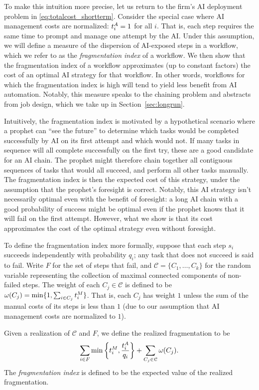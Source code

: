 To make this intuition more precise, let us return to the firm's AI deployment problem in \eqref{eq:totalcost_shortterm}.
Consider the special case where AI management costs are normalized: $t^{A}_{i} = 1$ for all $i$.
That is, each step requires the same time to prompt and manage one attempt by the AI.
Under this assumption, we will define a measure of the dispersion of AI-exposed steps in a workflow, which we refer to as the \emph{fragmentation index} of a workflow.
We then show that the fragmentation index of a workflow approximates (up to constant factors) the cost of an optimal AI strategy for that workflow.
In other words, workflows for which the fragmentation index is high will tend to yield less benefit from AI automation.
Notably, this measure speaks to the chaining problem and abstracts from job design, which we take up in Section~\ref{sec:longrun}.

Intuitively, the fragmentation index is motivated by a hypothetical scenario where a prophet can ``see the future'' to determine which tasks would be completed successfully by AI on its first attempt and which would not.
If many tasks in sequence will all complete successfully on the first try, these are a good candidate for an AI chain.
The prophet might therefore chain together all contiguous sequences of tasks that would all succeed, and perform all other tasks manually.
The fragmentation index is then the expected cost of this strategy, under the assumption that the prophet's foresight is correct.
Notably, this AI strategy isn't necessarily optimal even with the benefit of foresight: a long AI chain with a good probability of success might be optimal even if the prophet knows that it will fail on the first attempt.
However, what we show is that its cost approximates the cost of the optimal strategy even without foresight.

To define the fragmentation index more formally, suppose that each step $s_i$ succeeds independently with probability $q_i$; any task that does not succeed is said to fail.
Write $F$ for the set of steps that fail, and $\mathcal{C} = \{C_1, \dotsc, C_k\}$ for the random variable representing the collection of maximal connected components of non-failed steps.
The weight of each $C_j \in \mathcal{C}$ is defined to be $\omega(C_j) = \min\{ 1, \sum_{i \in C_j} t^{M}_{i} \}$.
That is, each $C_j$ has weight $1$ unless the sum of the manual costs of its steps is less than $1$ (due to our assumption that AI management costs are normalized to $1$).

Given a realization of $\mathcal{C}$ and $F$, we define the realized fragmentation to be
\begin{equation}
    \sum_{i \in F}\min\left\{t^{M}_{i}, \frac{t^{A}_{i}}{q_i}\right\} + \sum_{C_j \in \mathcal{C}} \omega(C_j).\label{eq:fragmentation}
\end{equation}
The \emph{fragmentation index} is defined to be the expected value of the realized fragmentation.

